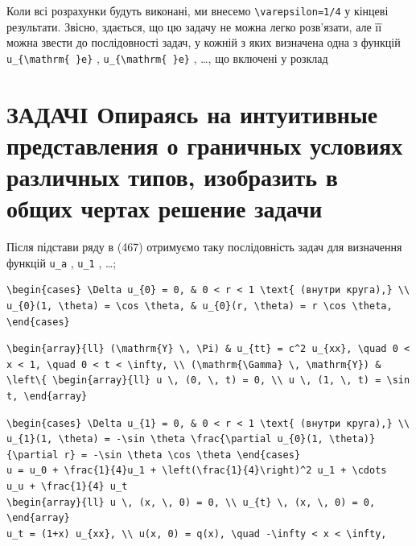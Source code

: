 \documentclass[
  ukrainian,
]{article}
\begin{document}
Коли всі розрахунки будуть виконані, ми внесемо
\texttt{\textbackslash{}varepsilon=1/4} у кінцеві результати. Звісно,
здається, що цю задачу не можна легко розв'язати, але її можна звести до
послідовності задач, у кожній з яких визначена одна з функцій
\texttt{u\_\{\textbackslash{}mathrm\{\ \}e\}} ,
\texttt{u\_\{\textbackslash{}mathrm\{\ \}e\}} , \ldots, що включені у
розклад

\section{ЗАДАЧІ Опираясь на интуитивные представления о граничных
условиях различных типов, изобразить в общих чертах решение
задачи}\label{ux437ux430ux434ux430ux447ux456-ux43eux43fux438ux440ux430ux44fux441ux44c-ux43dux430-ux438ux43dux442ux443ux438ux442ux438ux432ux43dux44bux435-ux43fux440ux435ux434ux441ux442ux430ux432ux43bux435ux43dux438ux44f-ux43e-ux433ux440ux430ux43dux438ux447ux43dux44bux445-ux443ux441ux43bux43eux432ux438ux44fux445-ux440ux430ux437ux43bux438ux447ux43dux44bux445-ux442ux438ux43fux43eux432-ux438ux437ux43eux431ux440ux430ux437ux438ux442ux44c-ux432-ux43eux431ux449ux438ux445-ux447ux435ux440ux442ux430ux445-ux440ux435ux448ux435ux43dux438ux435-ux437ux430ux434ux430ux447ux438}

Після підстави ряду в (467) отримуємо таку послідовність задач для
визначення функцій \texttt{u\_a} , \texttt{u\_1} , \ldots;

\begin{verbatim}
\begin{cases} \Delta u_{0} = 0, & 0 < r < 1 \text{ (внутри круга),} \\ u_{0}(1, \theta) = \cos \theta, & u_{0}(r, \theta) = r \cos \theta, \end{cases}
\end{verbatim}

\begin{verbatim}
\begin{array}{ll} (\mathrm{Y} \, \Pi) & u_{tt} = c^2 u_{xx}, \quad 0 < x < 1, \quad 0 < t < \infty, \\ (\mathrm{\Gamma} \, \mathrm{Y}) & \left\{ \begin{array}{ll} u \, (0, \, t) = 0, \\ u \, (1, \, t) = \sin t, \end{array}
\end{verbatim}

\begin{verbatim}
\begin{cases} \Delta u_{1} = 0, & 0 < r < 1 \text{ (внутри круга),} \\ u_{1}(1, \theta) = -\sin \theta \frac{\partial u_{0}(1, \theta)}{\partial r} = -\sin \theta \cos \theta \end{cases}
u = u_0 + \frac{1}{4}u_1 + \left(\frac{1}{4}\right)^2 u_1 + \cdots
u_u + \frac{1}{4} u_t
\begin{array}{ll} u \, (x, \, 0) = 0, \\ u_{t} \, (x, \, 0) = 0, \end{array}
u_t = (1+x) u_{xx}, \\ u(x, 0) = q(x), \quad -\infty < x < \infty,
\end{verbatim}
\end{document}
